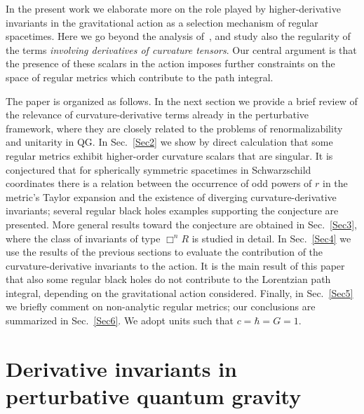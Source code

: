 \documentclass[aps,prd,a4paper,twocolumn,showpacs,showkeys,preprintnumbers,amsmath,amssymb,nofootinbib,usenames,dvipsnames]{revtex4-2}
\begin{document}
In the present work we elaborate more on the role played by higher-derivative invariants in the gravitational action as a selection mechanism of regular spacetimes. 
Here we go beyond the analysis of~\cite{Borissova:2020knn}, and study also the regularity of the terms {\it involving derivatives of curvature tensors}.
Our central argument is that the presence of these scalars in the action imposes further constraints on the space of regular metrics which contribute to the path integral.

The paper is organized as follows. In the next section we provide a brief review of the relevance of curvature-derivative terms already in the perturbative framework, where they are closely related to the problems of renormalizability and unitarity in QG.
In Sec.~\ref{Sec2} we show by direct calculation that some regular metrics exhibit higher-order curvature scalars that are singular. It is conjectured that for spherically symmetric spacetimes in Schwarzschild coordinates there is a relation between the occurrence of odd powers of $r$ in the metric's Taylor expansion and the existence of diverging curvature-derivative invariants; several regular black holes examples supporting the conjecture are presented.
More general results toward the conjecture are obtained in Sec.~\ref{Sec3}, where the class of invariants of type $\Box^n R$ is studied in detail.
In Sec.~\ref{Sec4} we use the results of the previous sections to evaluate the contribution of the curvature-derivative invariants to the action. It is the main result of this paper that also some regular black holes do not contribute to the Lorentzian path integral, depending on the gravitational action considered.
Finally, in Sec.~\ref{Sec5} we briefly comment on non-analytic regular metrics; our conclusions are summarized in Sec.~\ref{Sec6}.  We adopt units such that $c = \hbar = G = 1$.

\section{Derivative invariants in perturbative quantum gravity}
\label{Sec1.2}
\end{document}
